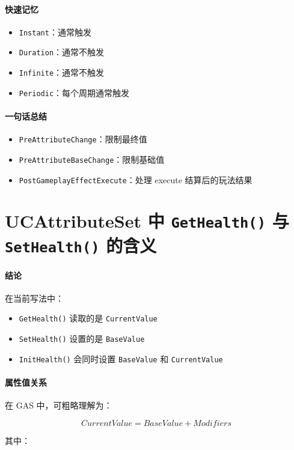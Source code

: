 \paragraph{快速记忆}
\begin{itemize}
	\item \texttt{Instant}：通常触发
	\item \texttt{Duration}：通常不触发
	\item \texttt{Infinite}：通常不触发
	\item \texttt{Periodic}：每个周期通常触发
\end{itemize}

\paragraph{一句话总结}
\begin{itemize}
	\item \texttt{PreAttributeChange}：限制最终值
	\item \texttt{PreAttributeBaseChange}：限制基础值
	\item \texttt{PostGameplayEffectExecute}：处理 execute 结算后的玩法结果
\end{itemize}

\section{UCAttributeSet 中 \texttt{GetHealth()} 与 \texttt{SetHealth()} 的含义}

\paragraph{结论}
在当前写法中：

\begin{itemize}
	\item \texttt{GetHealth()} 读取的是 \texttt{CurrentValue}
	\item \texttt{SetHealth()} 设置的是 \texttt{BaseValue}
	\item \texttt{InitHealth()} 会同时设置 \texttt{BaseValue} 和 \texttt{CurrentValue}
\end{itemize}

\paragraph{属性值关系}
在 GAS 中，可粗略理解为：

\[
CurrentValue = BaseValue + Modifiers
\]

其中：

